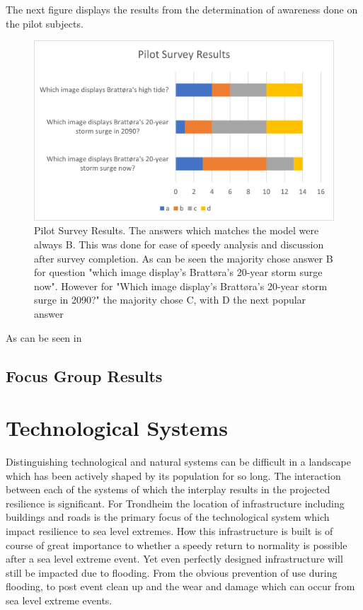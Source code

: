 The next figure displays the results from the determination of awareness done on the pilot subjects.

\begin{figure}[h]
    \centering
    \includegraphics{fig_results/pilot-survey-results.png}
    \caption{Pilot Survey Results. The answers which matches the model \cite{kartverket_se_2021} were always B. This was done for ease of speedy analysis and discussion after survey completion. As can be seen the majority chose answer B for question "which image display's Brattøra's 20-year storm surge now". However for "Which image display's Brattøra's 20-year storm surge in 2090?" the majority chose C, with D the next popular answer   }
    \label{fig:pilot_survey_results}
\end{figure}

As can be seen in



\subsection{Focus Group Results}

\section{Technological Systems}

Distinguishing technological and natural systems can be difficult in a landscape which has been actively shaped by its population for so long. The interaction between each of the systems of which the interplay results in the projected resilience is significant. For Trondheim the location of infrastructure including buildings and roads is the primary focus of the technological system which impact resilience to sea level extremes. How this infrastructure is built is of course of great importance to whether a speedy return to normality is possible after a sea level extreme event. Yet even perfectly designed infrastructure will still be impacted due to flooding. From the obvious  prevention of use during flooding, to post event clean up and the wear and damage which can occur from sea level extreme events.
